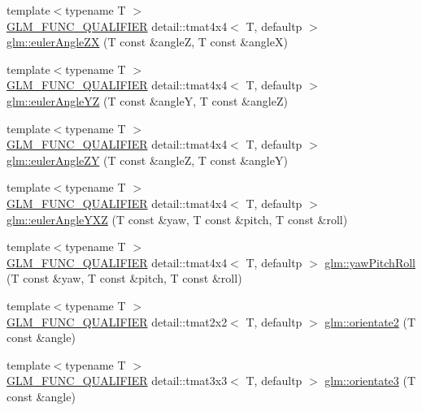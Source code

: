 \begin{DoxyCompactItemize}
\item 
{\footnotesize template$<$typename T $>$ }\\\hyperlink{setup_8hpp_a33fdea6f91c5f834105f7415e2a64407}{G\+L\+M\+\_\+\+F\+U\+N\+C\+\_\+\+Q\+U\+A\+L\+I\+F\+I\+ER} detail\+::tmat4x4$<$ T, defaultp $>$ \hyperlink{group__gtx__euler__angles_ga5766bbe3f5b17b5c33ed21b2933ff278}{glm\+::euler\+Angle\+ZX} (T const \&angleZ, T const \&angleX)
\item 
{\footnotesize template$<$typename T $>$ }\\\hyperlink{setup_8hpp_a33fdea6f91c5f834105f7415e2a64407}{G\+L\+M\+\_\+\+F\+U\+N\+C\+\_\+\+Q\+U\+A\+L\+I\+F\+I\+ER} detail\+::tmat4x4$<$ T, defaultp $>$ \hyperlink{group__gtx__euler__angles_ga4bff0f8324770261d3a6ddadd790ec22}{glm\+::euler\+Angle\+YZ} (T const \&angleY, T const \&angleZ)
\item 
{\footnotesize template$<$typename T $>$ }\\\hyperlink{setup_8hpp_a33fdea6f91c5f834105f7415e2a64407}{G\+L\+M\+\_\+\+F\+U\+N\+C\+\_\+\+Q\+U\+A\+L\+I\+F\+I\+ER} detail\+::tmat4x4$<$ T, defaultp $>$ \hyperlink{group__gtx__euler__angles_gaeabd76319f5a19188a0423769950df76}{glm\+::euler\+Angle\+ZY} (T const \&angleZ, T const \&angleY)
\item 
{\footnotesize template$<$typename T $>$ }\\\hyperlink{setup_8hpp_a33fdea6f91c5f834105f7415e2a64407}{G\+L\+M\+\_\+\+F\+U\+N\+C\+\_\+\+Q\+U\+A\+L\+I\+F\+I\+ER} detail\+::tmat4x4$<$ T, defaultp $>$ \hyperlink{group__gtx__euler__angles_gab9bc80f4f579efd8f0d161e8b58ff452}{glm\+::euler\+Angle\+Y\+XZ} (T const \&yaw, T const \&pitch, T const \&roll)
\item 
{\footnotesize template$<$typename T $>$ }\\\hyperlink{setup_8hpp_a33fdea6f91c5f834105f7415e2a64407}{G\+L\+M\+\_\+\+F\+U\+N\+C\+\_\+\+Q\+U\+A\+L\+I\+F\+I\+ER} detail\+::tmat4x4$<$ T, defaultp $>$ \hyperlink{group__gtx__euler__angles_gaf6f927d06835272cd6a61ee3f8f65f5e}{glm\+::yaw\+Pitch\+Roll} (T const \&yaw, T const \&pitch, T const \&roll)
\item 
{\footnotesize template$<$typename T $>$ }\\\hyperlink{setup_8hpp_a33fdea6f91c5f834105f7415e2a64407}{G\+L\+M\+\_\+\+F\+U\+N\+C\+\_\+\+Q\+U\+A\+L\+I\+F\+I\+ER} detail\+::tmat2x2$<$ T, defaultp $>$ \hyperlink{group__gtx__euler__angles_gab39476f0decc117783e02ba389a04ee7}{glm\+::orientate2} (T const \&angle)
\item 
{\footnotesize template$<$typename T $>$ }\\\hyperlink{setup_8hpp_a33fdea6f91c5f834105f7415e2a64407}{G\+L\+M\+\_\+\+F\+U\+N\+C\+\_\+\+Q\+U\+A\+L\+I\+F\+I\+ER} detail\+::tmat3x3$<$ T, defaultp $>$ \hyperlink{group__gtx__euler__angles_ga2c94907d441c40beb413fe3284c1b267}{glm\+::orientate3} (T const \&angle)

\end{DoxyCompactItemize}

